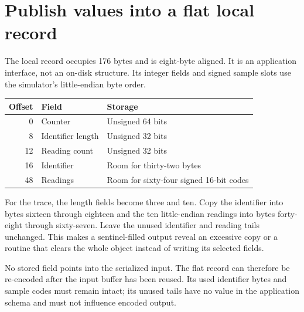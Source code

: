 \section{Publish values into a flat local record}
The local record occupies 176 bytes and is eight-byte aligned. It is an application
interface, not an on-disk structure. Its integer fields and signed sample slots use
the simulator's little-endian byte order.

\begin{center}
  \begin{tabular}{rll}
    Offset & Field             & Storage                                 \\
    \hline
    0      & Counter           & Unsigned 64 bits                        \\
    8      & Identifier length & Unsigned 32 bits                        \\
    12     & Reading count     & Unsigned 32 bits                        \\
    16     & Identifier        & Room for thirty-two bytes               \\
    48     & Readings          & Room for sixty-four signed 16-bit codes \\
  \end{tabular}
\end{center}

For the trace, the length fields become three and ten. Copy the identifier into bytes
sixteen through eighteen and the ten little-endian readings into bytes forty-eight
through sixty-seven. Leave the unused identifier and reading tails unchanged. This
makes a sentinel-filled output reveal an excessive copy or a routine that clears the
whole object instead of writing its selected fields.

No stored field points into the serialized input. The flat record can therefore be
re-encoded after the input buffer has been reused. Its used identifier bytes and sample
codes must remain intact; its unused tails have no value in the application schema and
must not influence encoded output.
